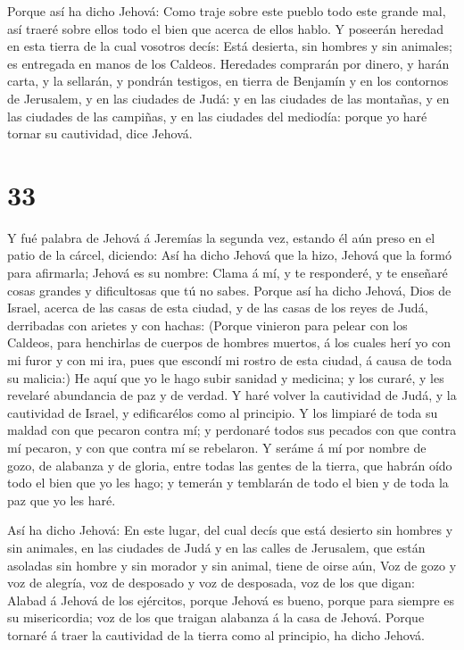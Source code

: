 Porque así ha dicho Jehová: Como traje sobre este pueblo
todo este grande mal, así traeré sobre ellos todo el bien que acerca de
ellos hablo.  Y poseerán heredad en esta tierra de la cual
vosotros decís: Está desierta, sin hombres y sin animales; es entregada
en manos de los Caldeos.  Heredades comprarán por dinero, y
harán carta, y la sellarán, y pondrán testigos, en tierra de Benjamín y
en los contornos de Jerusalem, y en las ciudades de Judá: y en las
ciudades de las montañas, y en las ciudades de las campiñas, y en las
ciudades del mediodía: porque yo haré tornar su cautividad, dice Jehová.

\hypertarget{section-32}{%
\section{33}\label{section-32}}

 Y fué palabra de Jehová á Jeremías la segunda vez, estando
él aún preso en el patio de la cárcel, diciendo:  Así ha
dicho Jehová que la hizo, Jehová que la formó para afirmarla; Jehová es
su nombre:  Clama á mí, y te responderé, y te enseñaré cosas
grandes y dificultosas que tú no sabes.  Porque así ha dicho
Jehová, Dios de Israel, acerca de las casas de esta ciudad, y de las
casas de los reyes de Judá, derribadas con arietes y con hachas:
 (Porque vinieron para pelear con los Caldeos, para
henchirlas de cuerpos de hombres muertos, á los cuales herí yo con mi
furor y con mi ira, pues que escondí mi rostro de esta ciudad, á causa
de toda su malicia:)  He aquí que yo le hago subir sanidad y
medicina; y los curaré, y les revelaré abundancia de paz y de verdad.
 Y haré volver la cautividad de Judá, y la cautividad de
Israel, y edificarélos como al principio.  Y los limpiaré de
toda su maldad con que pecaron contra mí; y perdonaré todos sus pecados
con que contra mí pecaron, y con que contra mí se rebelaron.
 Y seráme á mí por nombre de gozo, de alabanza y de gloria,
entre todas las gentes de la tierra, que habrán oído todo el bien que yo
les hago; y temerán y temblarán de todo el bien y de toda la paz que yo
les haré.

 Así ha dicho Jehová: En este lugar, del cual decís que
está desierto sin hombres y sin animales, en las ciudades de Judá y en
las calles de Jerusalem, que están asoladas sin hombre y sin morador y
sin animal, tiene de oirse aún,  Voz de gozo y voz de
alegría, voz de desposado y voz de desposada, voz de los que digan:
Alabad á Jehová de los ejércitos, porque Jehová es bueno, porque para
siempre es su misericordia; voz de los que traigan alabanza á la casa de
Jehová. Porque tornaré á traer la cautividad de la tierra como al
principio, ha dicho Jehová.

